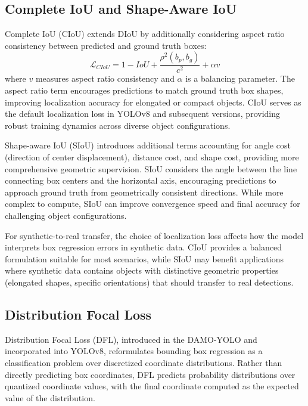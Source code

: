 \subsection{Complete IoU and Shape-Aware IoU}

Complete IoU (CIoU) extends DIoU by additionally considering aspect ratio consistency between predicted and ground truth boxes:
\begin{equation}
\mathcal{L}_{CIoU} = 1 - IoU + \frac{\rho^2(b_p, b_g)}{c^2} + \alpha v
\end{equation}
where $v$ measures aspect ratio consistency and $\alpha$ is a balancing parameter. The aspect ratio term encourages predictions to match ground truth box shapes, improving localization accuracy for elongated or compact objects. CIoU serves as the default localization loss in YOLOv8 and subsequent versions, providing robust training dynamics across diverse object configurations.

Shape-aware IoU (SIoU) introduces additional terms accounting for angle cost (direction of center displacement), distance cost, and shape cost, providing more comprehensive geometric supervision. SIoU considers the angle between the line connecting box centers and the horizontal axis, encouraging predictions to approach ground truth from geometrically consistent directions. While more complex to compute, SIoU can improve convergence speed and final accuracy for challenging object configurations.

For synthetic-to-real transfer, the choice of localization loss affects how the model interprets box regression errors in synthetic data. CIoU provides a balanced formulation suitable for most scenarios, while SIoU may benefit applications where synthetic data contains objects with distinctive geometric properties (elongated shapes, specific orientations) that should transfer to real detections.

\subsection{Distribution Focal Loss}

Distribution Focal Loss (DFL), introduced in the DAMO-YOLO and incorporated into YOLOv8, reformulates bounding box regression as a classification problem over discretized coordinate distributions. Rather than directly predicting box coordinates, DFL predicts probability distributions over quantized coordinate values, with the final coordinate computed as the expected value of the distribution.


